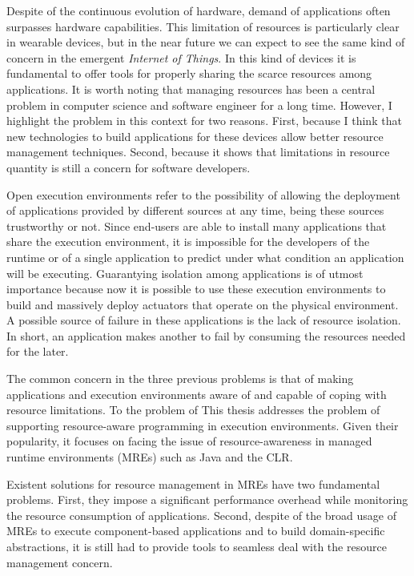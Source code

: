 Despite of the continuous evolution of hardware, demand of applications often surpasses hardware capabilities.
This limitation of resources is particularly clear in wearable devices, but in the near future we can expect to see the same kind of concern in the emergent \textit{Internet of Things}.
In this kind of devices it is fundamental to offer tools for properly sharing the scarce resources among applications.
It is worth noting that managing resources has been a central problem in computer science and software engineer for a long time.
However, I highlight the problem in this context for two reasons.
First, because I think that new technologies to build applications for these devices allow better resource management techniques.
Second, because it shows that limitations in resource quantity is still a concern for software developers.

Open execution environments refer to the possibility of allowing the deployment of applications provided by different sources at any time, being these sources trustworthy or not.
Since end-users are able to install many applications that share the execution environment, it is impossible for the developers of the runtime or of a single application to predict under what condition an application will be executing.
Guarantying isolation among applications is of utmost importance because now it is possible to use these execution environments to build and massively deploy actuators that operate on the physical environment.
A possible source of failure in these applications is the lack of resource isolation.
In short, an application makes another to fail by consuming the resources needed for the later.

The common concern in the three previous problems is that of making applications and execution environments aware of and capable of coping with resource limitations. 
To the problem of 
This thesis addresses the problem of supporting resource-aware programming in execution environments.
Given their popularity, it focuses on facing the issue of resource-awareness in managed runtime environments (MREs) such as Java and the CLR.

Existent solutions for resource management in MREs have two fundamental problems.
First, they impose a significant performance overhead while monitoring the resource consumption of applications.
Second, despite of the broad usage of MREs to execute component-based applications and to build domain-specific 
abstractions, it is still had to provide tools to seamless deal with the resource management concern.

